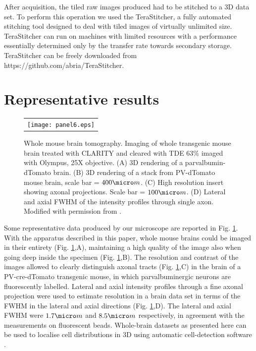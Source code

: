 \documentclass[12pt]{spieman}  %
\begin{document}
\begin{spacing}{2}
After acquisition, the tiled raw images produced had to be stitched to a 3D data set. To perform this operation we used the TeraStitcher\cite{Bria2012}, a fully automated stitching tool designed to deal with tiled images of virtually unlimited size. TeraStitcher can run on machines with limited resources with a performance essentially determined only by the transfer rate towards secondary storage. TeraStitcher can be freely downloaded from https://github.com/abria/TeraStitcher.

\section{Representative results}

	\begin{figure}
   \begin{center}
   \begin{tabular}{c}
   \texttt{[image: panel6.eps]}
   \end{tabular}
   \end{center}
   \caption{\label{fig:LSMdata} Whole mouse brain tomography. Imaging of whole transgenic mouse brain treated with CLARITY and cleared with TDE 63\% imaged with Olympus, 25X objective. (A) 3D rendering of a parvalbumin-dTomato brain. (B) 3D rendering of a stack from PV-dTomato mouse brain, scale bar = $400 \micro m$. (C) High resolution insert showing axonal projections. Scale bar = $100 \micro m$. (D) Lateral and axial FWHM of the intensity profiles through single axon. Modified with permission from \cite{Costantini}.} 
   \end{figure}

Some representative data produced by our microscope are reported in Fig. \ref{fig:LSMdata}. With the apparatus described in this paper, whole mouse brains could be imaged in their entirety (Fig. \ref{fig:LSMdata},A), maintaining a high quality of the image also when going deep inside the specimen (Fig. \ref{fig:LSMdata},B). The resolution and contrast of the images allowed to clearly distinguish axonal tracts (Fig. \ref{fig:LSMdata},C) in the brain of a PV-cre-dTomato transgenic mouse, in which parvalbuminergic neurons are fluorescently labelled. Lateral and axial intensity profiles through a fine axonal projection were used to estimate resolution in a brain data set in terms of the FWHM in the lateral and axial directions (Fig. \ref{fig:LSMdata},D). The lateral and axial FWHM were $1.7 \micro m$ and $8.5 \micro m$ respectively, in agreement with the measurements on fluorescent beads.  Whole-brain datasets as presented here can be used to localise cell distributions in 3D using automatic cell-detection software \cite{Frasconi2014}.


\end{spacing}
\end{document}
